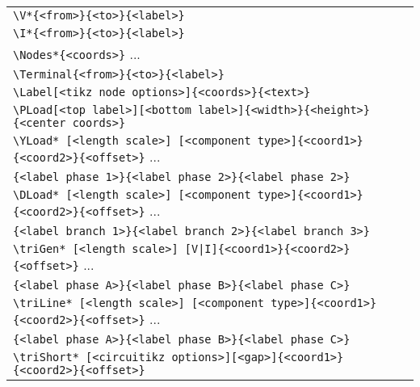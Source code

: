 \documentclass[a4paper,12pt]{article}
\begin{document}
\begin{center}
\begin{tabular}{l}
        \hline
        \texttt{\textbackslash V*\{\textless from\textgreater\}\{\textless to\textgreater\}\{\textless label\textgreater\}}  \\
        \texttt{\textbackslash I*\{\textless from\textgreater\}\{\textless to\textgreater\}\{\textless label\textgreater\}}  \\
        \hline
        \texttt{\textbackslash Nodes*\{\textless coords\textgreater\}} ... \\
        \texttt{\textbackslash Terminal\{\textless from\textgreater\}\{\textless to\textgreater\}\{\textless label\textgreater\}}  \\
        \texttt{\textbackslash Label[\textless tikz node options\textgreater]\{\textless coords\textgreater\}\{\textless text\textgreater\}}  \\
        \hline
        \texttt{\textbackslash PLoad[\textless top label\textgreater][\textless bottom label\textgreater]\{\textless width\textgreater\}\{\textless height\textgreater\}\{\textless center coords\textgreater\}} \\
        \hline
        \texttt{\textbackslash YLoad* [\textless length scale\textgreater] [\textless component type\textgreater]\{\textless coord1\textgreater\}\{\textless coord2\textgreater\}\{\textless offset\textgreater\}} ... \\
        \qquad\qquad\texttt{\{\textless label phase 1\textgreater\}\{\textless label phase 2\textgreater\}\{\textless label phase 2\textgreater\}} \\
        \texttt{\textbackslash DLoad* [\textless length scale\textgreater] [\textless component type\textgreater]\{\textless coord1\textgreater\}\{\textless coord2\textgreater\}\{\textless offset\textgreater\}} ...\\
        \qquad\qquad\texttt{\{\textless label branch 1\textgreater\}\{\textless label branch 2\textgreater\}\{\textless label branch 3\textgreater\}} \\
        \hline
        \texttt{\textbackslash triGen*  [\textless length scale\textgreater] [V|I]\{\textless coord1\textgreater\}\{\textless coord2\textgreater\}\{\textless offset\textgreater\}} ...\\
        \qquad\qquad\texttt{\{\textless label phase A\textgreater\}\{\textless label phase B\textgreater\}\{\textless label phase C\textgreater\}} \\
        \texttt{\textbackslash triLine* [\textless length scale\textgreater] [\textless component type\textgreater]\{\textless coord1\textgreater\}\{\textless coord2\textgreater\}\{\textless offset\textgreater\}} ...\\
        \qquad\qquad\texttt{\{\textless label phase A\textgreater\}\{\textless label phase B\textgreater\}\{\textless label phase C\textgreater\}} \\
        \texttt{\textbackslash triShort* [\textless circuitikz options\textgreater][\textless gap\textgreater]\{\textless coord1\textgreater\}\{\textless coord2\textgreater\}\{\textless offset\textgreater\}}\\
        \hline
        \hline
    \end{tabular}
\end{center}
\end{document}
